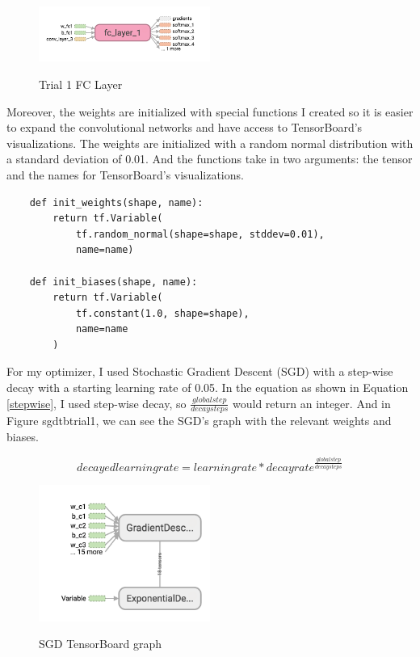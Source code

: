 \documentclass[twoside, column]{article}
\begin{document}
\begin{figure}
\caption{Trial 1 FC Layer}
\centering
\includegraphics[width=0.5\textwidth]{fc_trial_1}
\label{trial1fc}
\end{figure}

Moreover, the weights are initialized with special functions I created so it is easier to expand the convolutional networks and have access to TensorBoard's visualizations. The weights are initialized with a random normal distribution with a standard deviation of 0.01. And the functions take in two arguments: the tensor and the names for TensorBoard's visualizations.
\begin{verbatim}
    def init_weights(shape, name):
        return tf.Variable(
            tf.random_normal(shape=shape, stddev=0.01),
            name=name)

    def init_biases(shape, name):
        return tf.Variable(
            tf.constant(1.0, shape=shape),
            name=name
        )
\end{verbatim}
 
For my optimizer, I used Stochastic Gradient Descent (SGD) with a step-wise decay with a starting learning rate of 0.05. In the equation as shown in Equation \ref{stepwise}, I used step-wise decay, so $\frac {globalstep}{decaysteps}$ would return an integer. And in Figure {sgdtbtrial1}, we can see the SGD's graph with the relevant weights and biases.

\begin{equation} \label{stepwise}
decayed learning rate = learningrate * decayrate^\frac{globalstep}{decaysteps}
\end{equation}

\begin{figure}
\caption{SGD TensorBoard graph}
\centering
\includegraphics[width=0.5\textwidth]{gd_trial_1}
\label{sgdtbtrial1}
\end{figure}
\end{document}
